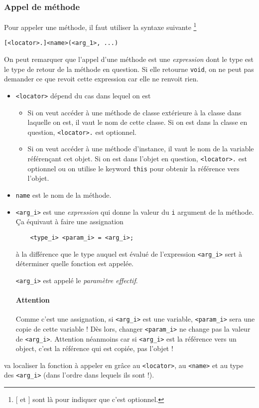 \subsubsection{Appel de méthode}
Pour appeler une méthode, il faut utiliser la syntaxe suivante
\footnote{[ et ] sont là pour indiquer que c'est optionnel.}
\begin{lstlisting}
[<locator>.]<name>(<arg_1>, ...)
\end{lstlisting}
On peut remarquer que l'appel d'une méthode est une \emph{expression}
dont le type est le type de retour de la méthode en question.
Si elle retourne \verb|void|, on ne peut pas demander ce que revoit cette
expression car elle ne renvoit rien.
\begin{itemize}
  \item \verb|<locator>| dépend du cas dans lequel on est
    \begin{itemize}
      \item Si on veut accéder à une méthode de classe extérieure à la classe
        dans laquelle on est, il vaut le nom de cette classe.
        Si on est dans la classe en question, \verb|<locator>.| est optionnel.
      \item Si on veut accéder à une méthode d'instance, il vaut le nom
        de la variable référençant cet objet.
        Si on est dans l'objet en question, \verb|<locator>.| est optionnel ou
        on utilise le keyword \verb|this| pour obtenir la référence vers
        l'objet.
    \end{itemize}
  \item \verb|name| est le nom de la méthode.
  \item \verb|<arg_i>| est une \emph{expression} qui donne la valeur
    du \verb|i|\ieme{} argument de la méthode.
    Ça équivaut à faire une assignation
    \begin{lstlisting}
    <type_i> <param_i> = <arg_i>;
    \end{lstlisting}
    à la différence que le type auquel est évalué de l'expression
    \verb|<arg_i>| sert à déterminer quelle fonction est appelée.

    \verb|<arg_i>| est appelé le \emph{paramètre effectif}.
    \paragraph{Attention} Comme c'est une assignation,
    si \verb|<arg_i>| est une variable, \verb|<param_i>| sera une copie de
    cette variable !
    Dès lors, changer \verb|<param_i>| ne change pas la valeur de
    \verb|<arg_i>|.
    Attention néanmoins car si \verb|<arg_i>| est la référence vers
    un object, c'est la référence qui est copiée, pas l'objet !
\end{itemize}
\java{} va localiser la fonction à appeler en grâce au \verb|<locator>|,
au \verb|<name>| et au type des \verb|<arg_i>| (dans l'ordre dans lequels ils
sont !).

